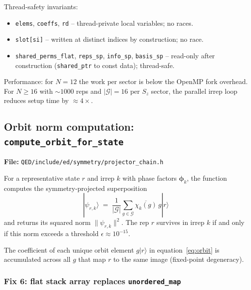 \documentclass[11pt,a4paper]{article}
\newcommand{\ket}[1]{|{#1}\rangle}
\begin{document}
Thread-safety invariants:
\begin{itemize}[nosep]
  \item \texttt{elems}, \texttt{coeffs}, \texttt{rd} -- thread-private local
    variables; no races.
  \item \texttt{slot[si]} -- written at distinct indices by construction; no
    race.
  \item \texttt{shared\_perms\_flat}, \texttt{reps\_sp}, \texttt{info\_sp},
    \texttt{basis\_sp} -- read-only after construction (\texttt{shared\_ptr}
    to const data); thread-safe.
\end{itemize}

Performance: for $N=12$ the work per sector is below the OpenMP fork overhead.
For $N \ge 16$ with $\sim 1000$ reps and $|\mathcal{G}| = 16$ per $S_z$
sector, the parallel irrep loop reduces setup time by $\approx 4\times$.

\subsection{Orbit norm computation: \texttt{compute\_orbit\_for\_state}}
\label{sec:orbit}

\textbf{File:} \texttt{QED/include/ed/symmetry/projector\_chain.h}

For a representative state $r$ and irrep $k$ with phase factors
$\boldsymbol{\phi}_k$, the function computes the symmetry-projected
superposition
\begin{equation}
  |\psi_{r,k}\rangle \;=\; \frac{1}{|\mathcal{G}|}\sum_{g\in\mathcal{G}}
    \overline{\chi_k(g)}\,g\ket{r}
  \label{eq:orbit}
\end{equation}
and returns its squared norm $\|\psi_{r,k}\|^2$.  The rep $r$ survives in
irrep $k$ if and only if this norm exceeds a threshold $\epsilon \approx
10^{-15}$.

The coefficient of each unique orbit element $g\ket{r}$ in
equation~\eqref{eq:orbit} is accumulated across all $g$ that map $r$ to
the same image (fixed-point degeneracy).

\subsubsection{Fix 6: flat stack array replaces \texttt{unordered\_map}}
\label{sec:fix6}
\end{document}
